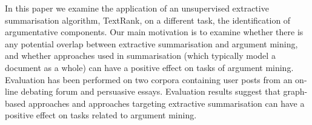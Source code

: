 In this paper we examine the application of an unsupervised extractive summarisation algorithm, TextRank, on a different task, the identification of argumentative components. Our main motivation is to examine whether there is any potential overlap between extractive summarisation and argument mining, and whether approaches used in summarisation (which typically model a document as a whole) can have a positive effect on tasks of argument mining. Evaluation has been performed on two corpora containing user posts from an on-line debating forum and persuasive essays. Evaluation results suggest that graph-based approaches and approaches targeting extractive summarisation can have a positive effect on tasks related to argument mining.
